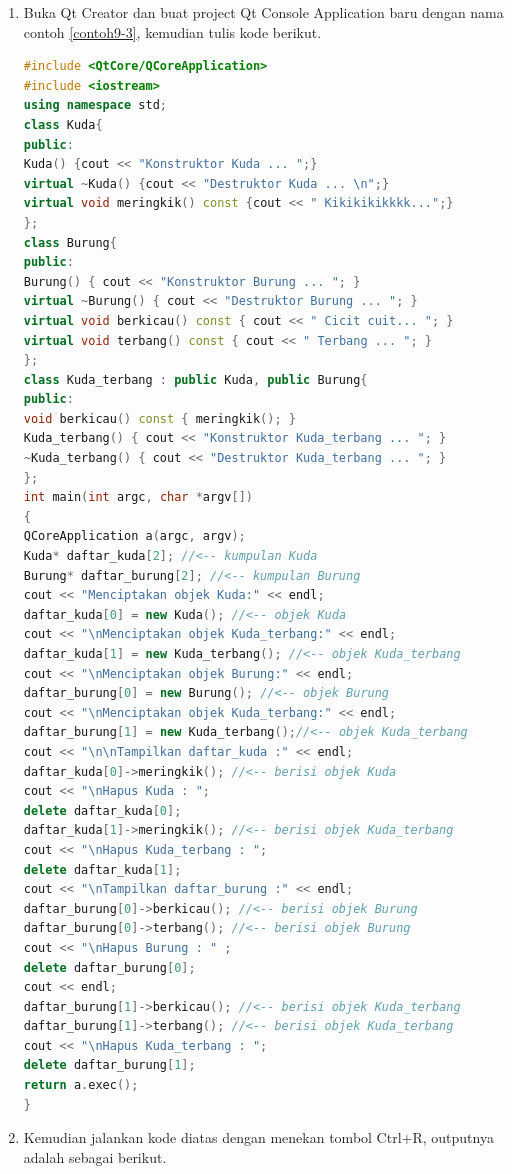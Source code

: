\begin{enumerate}

\item
  Buka Qt Creator dan buat project Qt Console Application baru dengan
  nama contoh \ref{contoh9-3}, kemudian tulis kode berikut.

\begin{lstlisting}[language=c++, caption=Multiple Inheritance, label=contoh9-3]
#include <QtCore/QCoreApplication>
#include <iostream>
using namespace std;
class Kuda{
public:
Kuda() {cout << "Konstruktor Kuda ... ";}
virtual ~Kuda() {cout << "Destruktor Kuda ... \n";}
virtual void meringkik() const {cout << " Kikikikikkkk...";}
};
class Burung{
public:
Burung() { cout << "Konstruktor Burung ... "; }
virtual ~Burung() { cout << "Destruktor Burung ... "; }
virtual void berkicau() const { cout << " Cicit cuit... "; }
virtual void terbang() const { cout << " Terbang ... "; }
};
class Kuda_terbang : public Kuda, public Burung{
public:
void berkicau() const { meringkik(); }
Kuda_terbang() { cout << "Konstruktor Kuda_terbang ... "; }
~Kuda_terbang() { cout << "Destruktor Kuda_terbang ... "; }
};
int main(int argc, char *argv[])
{
QCoreApplication a(argc, argv);
Kuda* daftar_kuda[2]; //<-- kumpulan Kuda
Burung* daftar_burung[2]; //<-- kumpulan Burung
cout << "Menciptakan objek Kuda:" << endl;
daftar_kuda[0] = new Kuda(); //<-- objek Kuda
cout << "\nMenciptakan objek Kuda_terbang:" << endl;
daftar_kuda[1] = new Kuda_terbang(); //<-- objek Kuda_terbang
cout << "\nMenciptakan objek Burung:" << endl;
daftar_burung[0] = new Burung(); //<-- objek Burung
cout << "\nMenciptakan objek Kuda_terbang:" << endl;
daftar_burung[1] = new Kuda_terbang();//<-- objek Kuda_terbang
cout << "\n\nTampilkan daftar_kuda :" << endl;
daftar_kuda[0]->meringkik(); //<-- berisi objek Kuda
cout << "\nHapus Kuda : ";
delete daftar_kuda[0];
daftar_kuda[1]->meringkik(); //<-- berisi objek Kuda_terbang
cout << "\nHapus Kuda_terbang : ";
delete daftar_kuda[1];
cout << "\nTampilkan daftar_burung :" << endl;
daftar_burung[0]->berkicau(); //<-- berisi objek Burung
daftar_burung[0]->terbang(); //<-- berisi objek Burung
cout << "\nHapus Burung : " ;
delete daftar_burung[0];
cout << endl;
daftar_burung[1]->berkicau(); //<-- berisi objek Kuda_terbang
daftar_burung[1]->terbang(); //<-- berisi objek Kuda_terbang
cout << "\nHapus Kuda_terbang : ";
delete daftar_burung[1];
return a.exec();
}
\end{lstlisting}
\item
  Kemudian jalankan kode diatas dengan menekan tombol Ctrl+R, outputnya
  adalah sebagai berikut.
\end{enumerate}

